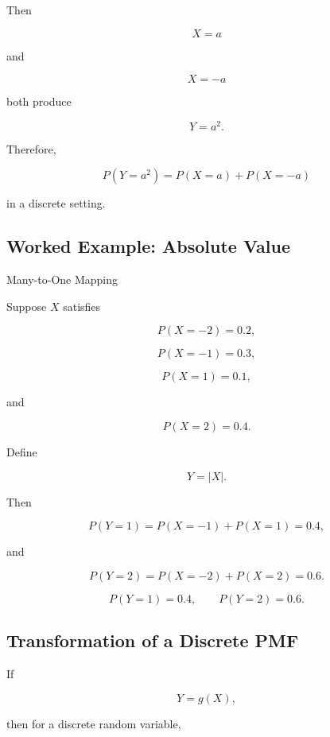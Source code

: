 Then

\[
X=a
\]

and

\[
X=-a
\]

both produce

\[
Y=a^2.
\]

Therefore,

\[
\boxed{
P(Y=a^2)
=
P(X=a)+P(X=-a)
}
\]

in a discrete setting.

\subsection{Worked Example: Absolute Value}
\label{subsec:worked-absolute-value-rv}

\begin{workedexamplebox}{Many-to-One Mapping}

Suppose \(X\) satisfies

\[
P(X=-2)=0.2,
\]

\[
P(X=-1)=0.3,
\]

\[
P(X=1)=0.1,
\]

and

\[
P(X=2)=0.4.
\]

Define

\[
Y=|X|.
\]

Then

\[
P(Y=1)
=
P(X=-1)+P(X=1)
=
0.4,
\]

and

\[
P(Y=2)
=
P(X=-2)+P(X=2)
=
0.6.
\]

\begin{answerbox}
\[
\boxed{
P(Y=1)=0.4,
\qquad
P(Y=2)=0.6.
}
\]
\end{answerbox}

\end{workedexamplebox}

\subsection{Transformation of a Discrete PMF}
\label{subsec:discrete-transformation-pmf}

If

\[
Y=g(X),
\]

then for a discrete random variable,

